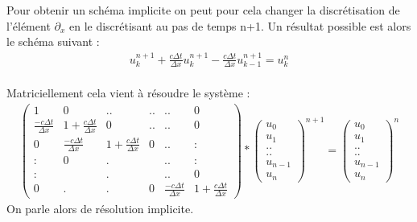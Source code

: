 \documentclass[12pt]{article}
\begin{document}
\noindent Pour obtenir un schéma implicite on peut pour cela changer la discrétisation de l'élément $\partial_x$ en le discrétisant au pas de temps n+1. 
Un résultat possible est alors le schéma suivant :
\begin{eqnarray*}
         u_k^{n+1} +\frac{c\Delta t}{\Delta x}u_k^{n+1}-\frac{c\Delta t}{\Delta x}u_{k-1}^{n+1}=u_k^n
\end{eqnarray*}
\\Matriciellement cela vient à résoudre le système :
\begin{eqnarray*}
        \begin{pmatrix}
   1 & 0 & .. & .. &.. & 0 \\
   \frac{-c\Delta t}{\Delta x} & 1 + \frac{c\Delta t}{\Delta x} &0 &..&.. &0 \\
   0 & \frac{-c\Delta t}{\Delta x} & 1 + \frac{c\Delta t}{\Delta x} & 0 &.. & : \\
   : & 0 & . &  &.. & : \\
   : &  & . &  &.. & 0 \\
   0 & . & . & 0 &\frac{-c\Delta t}{\Delta x} & 1 + \frac{c\Delta t}{\Delta x}
   
\end{pmatrix}
*         \begin{pmatrix}
  u_0\\
  u_1\\
  ..\\
  ..\\
  u_{n-1}\\
  u_n
\end{pmatrix}^{n+1}
= \begin{pmatrix}
  u_0\\
  u_1\\
  ..\\
  ..\\
  u_{n-1}\\
  u_n
\end{pmatrix}^n
\end{eqnarray*}
On parle alors de résolution implicite.
\end{document}
